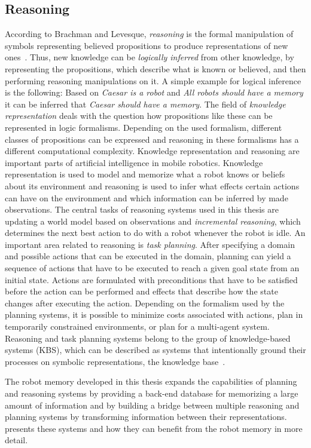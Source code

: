 \subsection{Reasoning}
\label{sec:reasoning}
According to Brachman and Levesque, \emph{reasoning} is the formal
manipulation of symbols representing believed propositions to produce
representations of new ones~\cite{kr-book}. Thus, new knowledge can be
\emph{logically inferred} from other knowledge, by representing the
propositions, which describe what is known or believed, and then
performing reasoning manipulations on it.  A simple example for
logical inference is the following: Based on \emph{Caesar is a robot}
and \emph{All robots should have a memory} it can be inferred that
\emph{Caesar should have a memory}.  The field of \emph{knowledge
  representation} deals with the question how propositions like these
can be represented in logic formalisms.  Depending on the used
formalism, different classes of propositions can be expressed and
reasoning in these formalisms has a different computational
complexity. Knowledge representation and reasoning are important parts
of artificial intelligence in mobile robotics. Knowledge
representation is used to model and memorize what a robot knows or
beliefs about its environment and reasoning is used to infer what
effects certain actions can have on the environment and which
information can be inferred by made observations. The central tasks of
reasoning systems used in this thesis are updating a world model based
on observations and \emph{incremental reasoning}, which determines the
next best action to do with a robot whenever the robot is idle. An
important area related to reasoning is \emph{task planning}. After
specifying a domain and possible actions that can be executed in the
domain, planning can yield a sequence of actions that have to be
executed to reach a given goal state from an initial state. Actions
are formulated with preconditions that have to be satisfied before the
action can be performed and effects that describe how the state
changes after executing the action. Depending on the formalism used by
the planning systems, it is possible to minimize costs associated with
actions, plan in temporarily constrained environments, or plan for a
multi-agent system. Reasoning and task planning systems belong to the
group of knowledge-based systems (KBS), which can be described as
systems that intentionally ground their processes on symbolic
representations, the knowledge base~\cite{kr-book}.

The robot memory developed in this thesis expands the capabilities of
planning and reasoning systems by providing a back-end database for
memorizing a large amount of information and by building a bridge
between multiple reasoning and planning systems by transforming
information between their representations. 
presents these systems and how they can benefit from the robot memory
in more detail.
  
